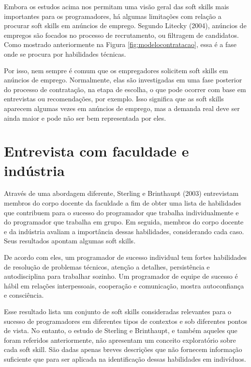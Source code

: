 Embora os estudos acima nos permitam uma visão geral das soft skills mais importantes para os programadores, há algumas limitações com relação a procurar soft skills em anúncios de emprego. Segundo Litecky (2004)\nocite{litecky:04}, anúncios de empregos são focados no processo de recrutamento, ou filtragem de candidatos. Como mostrado anteriormente na Figura \ref{fig:modelocontratacao}, essa é a fase onde se procura por habilidades técnicas.

Por isso, nem sempre é comum que os empregadores solicitem soft skills em anúncios de emprego.
Normalmente, elas são investigadas em uma fase posterior do processo de contratação, na etapa de escolha, o que pode ocorrer com base em entrevistas ou recomendações, por exemplo. Isso significa que as soft skills aparecem algumas vezes em anúncios de emprego, mas a demanda real deve ser ainda maior e pode não ser bem representada por eles.

\section{Entrevista com faculdade e indústria}
\label{sec:entrevista}

Através de uma abordagem diferente, Sterling e Brinthaupt (2003)\nocite{sterling:03} entrevistam membros do corpo docente da faculdade a fim de obter uma lista de habilidades que contribuem para o sucesso do programador que trabalha individualmente e do programador que trabalha em grupo. Em seguida, membros do corpo docente e da indústria avaliam a importância dessas habilidades, considerando cada caso. Seus resultados apontam algumas soft skills.

De acordo com eles, um programador de sucesso individual tem fortes habilidades de resolução de problemas técnicos, atenção a detalhes, persistência e autodisciplina para trabalhar sozinho. Um programador de equipe de sucesso é hábil em relações interpessoais, cooperação e comunicação, mostra autoconfiança e consciência.

Esse resultado lista um conjunto de soft skills consideradas relevantes para o sucesso de programadores em diferentes tipos de contextos e sob diferentes pontos de vista. No entanto, o estudo de Sterling e Brinthaupt, e também aqueles que foram referidos anteriormente, não apresentam um conceito exploratório sobre cada soft skill. São dadas apenas breves descrições que não fornecem informação suficiente que para ser aplicada na identificação dessas habilidades em indivíduos.


